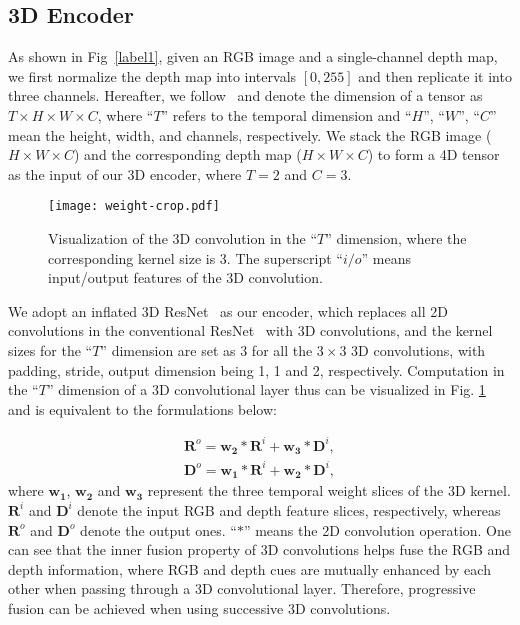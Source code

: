 \documentclass[letterpaper]{article}
\begin{document}
\subsection{3D Encoder}
As shown in Fig~\ref{label1}, given an RGB image and a single-channel depth map, we first normalize the depth map into intervals $[0,255]$ and then replicate it into three channels. Hereafter, we follow~\cite{wang2018non} and denote the dimension of a tensor as $T\times H\times W\times C$, where ``$T$'' refers to the temporal dimension and ``$H$'', ``$W$'', ``$C$'' mean the height, width, and channels, respectively. We stack the RGB image ($H\times W \times C$) and the corresponding depth map ($H\times W \times C$) to form a 4D tensor as the input of our 3D encoder, where $T=2$ and $C=3$.
\begin{figure}
	\centering
	\texttt{[image: weight-crop.pdf]}\vspace{-0.4cm}
	\caption{\small Visualization of the 3D convolution in the ``$T$'' dimension, where the corresponding kernel size is 3. The superscript ``$i/o$'' means input/output features of the 3D convolution.}\vspace{-0.5cm}
	\label{3dconv}
\end{figure}
We adopt an inflated 3D ResNet~\cite{carreira2017quo} as our encoder, which replaces all 2D convolutions in the conventional ResNet~\cite{ResNET} with 3D convolutions, and the kernel sizes for the ``$T$'' dimension are set as 3 for all the $3 \times 3$ 3D convolutions, with padding, stride, output dimension being 1, 1 and 2, respectively. Computation in the ``$T$'' dimension of a 3D convolutional layer thus can be visualized in Fig. \ref{3dconv} and is equivalent to the formulations below:

\vspace{-0.2cm}
\begin{equation}\label{equ1}
\begin{split}
    \mathbf{R}^o=\mathbf{w_2} \ast \mathbf{R}^i + \mathbf{w_3} \ast \mathbf{D}^i,\\
    \mathbf{D}^o=\mathbf{w_1} \ast \mathbf{R}^i + \mathbf{w_2} \ast \mathbf{D}^i,
\end{split}
\end{equation}
where $\mathbf{w_1}$, $\mathbf{w_2}$ and $\mathbf{w_3}$ represent the three temporal weight slices of the 3D kernel. $\mathbf{R}^i$ and $\mathbf{D}^i$ denote the input RGB and depth feature slices, respectively, whereas $\mathbf{R}^o$ and $\mathbf{D}^o$ denote the output ones. ``$\ast$'' means the 2D convolution operation. One can see that the inner fusion property of 3D convolutions helps fuse the RGB and depth information, where RGB and depth cues are mutually enhanced by each other when passing through a 3D convolutional layer. Therefore, progressive fusion can be achieved when using successive 3D convolutions.
\end{document}
